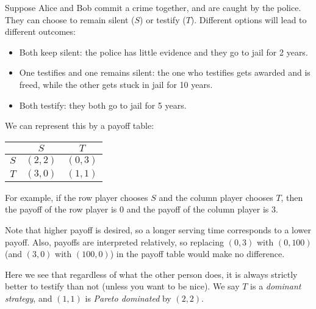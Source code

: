 \documentclass[a4paper]{article}
\begin{document}
\begin{eg}
  Suppose Alice and Bob commit a crime together, and are caught by the police. They can choose to remain silent ($S$) or testify ($T$). Different options will lead to different outcomes:
  \begin{itemize}
    \item Both keep silent: the police has little evidence and they go to jail for 2 years.
    \item One testifies and one remains silent: the one who testifies gets awarded and is freed, while the other gets stuck in jail for 10 years.
    \item Both testify: they both go to jail for 5 years.
  \end{itemize}

  We can represent this by a payoff table:
  \begin{center}
    \begin{tabular}{ccc}
      \toprule
      & $S$ & $T$\\
      \midrule
      $S$ & $(2, 2)$ & $(0, 3)$\\
      $T$ & $(3, 0)$ & $(1, 1)$\\
      \bottomrule
    \end{tabular}
  \end{center}
  For example, if the row player chooses $S$ and the column player chooses $T$, then the payoff of the row player is $0$ and the payoff of the column player is $3$.

  Note that higher payoff is desired, so a longer serving time corresponds to a lower payoff. Also, payoffs are interpreted relatively, so replacing $(0, 3)$ with $(0, 100)$ (and $(3, 0)$ with $(100, 0)$) in the payoff table would make no difference.

  Here we see that regardless of what the other person does, it is always strictly better to testify than not (unless you want to be nice). We say $T$ is a \emph{dominant strategy}, and $(1, 1)$ is \emph{Pareto dominated} by $(2, 2)$.
\end{eg}
\end{document}
